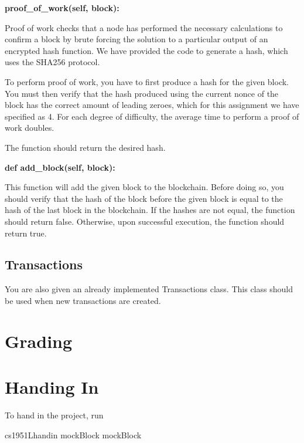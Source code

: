 \documentclass{article}
\begin{document}
\textbf{proof\_of\_work(self, block):}\par
Proof of work checks that a node has performed the necessary calculations to confirm a block by brute forcing the solution to a particular output of an encrypted hash function. We have provided the code to generate a hash, which uses the SHA256 protocol.\par
\vspace{5mm}

To perform proof of work, you have to first produce a hash for the given block. You must then verify that the hash produced using the current nonce of the block has the correct amount of leading zeroes, which for this assignment we have specified as 4. For each degree of difficulty, the average time to perform a proof of work doubles.\par
\vspace{5mm}
The function should return the desired hash.

\vspace{5mm}


\textbf{def add\_block(self, block):}\par 
This function will add the given block to the blockchain. Before doing so, you should verify that the hash of the block before the given block is equal to the hash of the last block in the blockchain. If the hashes are not equal, the function should return false. Otherwise, upon successful execution, the function should return true.
\subsection{Transactions}
You are also given an already implemented Transactions class. This class should be used when new transactions are created.
\section{Grading}
\section{Handing In}
To hand in the project, run \par \vspace{5mm} 

\hspace*{6mm} cs1951L\textunderscore handin mockBlock mockBlock \par \vspace{5mm}
\end{document}

